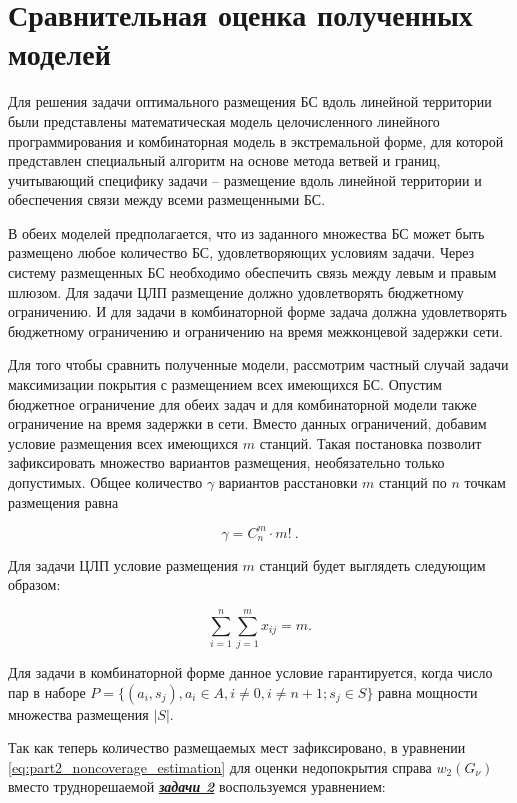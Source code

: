 \section{Сравнительная оценка полученных моделей}
Для решения задачи оптимального размещения БС вдоль линейной территории были представлены математическая модель целочисленного линейного программирования и комбинаторная модель в экстремальной форме, для которой представлен специальный алгоритм на основе метода ветвей и границ, учитывающий специфику задачи -- размещение вдоль линейной территории и обеспечения связи между всеми размещенными БС.

В обеих моделей предполагается, что из заданного множества БС может быть размещено любое количество БС, удовлетворяющих условиям задачи. Через систему размещенных БС необходимо обеспечить связь между левым и правым шлюзом. Для задачи ЦЛП размещение должно удовлетворять бюджетному ограничению. И для задачи в комбинаторной форме задача должна удовлетворять бюджетному ограничению и ограничению на время межконцевой задержки сети.

Для того чтобы сравнить полученные модели, рассмотрим частный случай задачи максимизации покрытия с размещением всех имеющихся БС. Опустим бюджетное ограничение для обеих задач и для комбинаторной модели также ограничение на время задержки в сети. Вместо данных ограничений, добавим условие размещения всех имеющихся $m$ станций. Такая постановка позволит зафиксировать множество вариантов размещения, необязательно только допустимых. Общее количество $\gamma$ вариантов расстановки $m$ станций по $n$ точкам размещения равна 

\begin{equation}
  \label{eq:part2_gamma}
  \gamma = C^m_n \cdot m! \ .
\end{equation}

Для задачи ЦЛП условие размещения $m$ станций будет выглядеть следующим образом:


\begin{equation}
  \label{eq:part3_placed_all_station}
  \sum\limits_{i=1}^n \sum\limits_{j=1}^m x_{ij} = m.
\end{equation}

Для задачи в комбинаторной форме данное условие гарантируется, когда число пар в наборе $P = \{ (a_i, s_j), a_i \in A, i \neq 0, i \neq n + 1; s_j \in S\}$ равна мощности множества размещения $|S|$. 

Так как теперь количество размещаемых мест зафиксировано, в уравнении \cref{eq:part2_noncoverage_estimation} для оценки недопокрытия справа $w_2 \left(G_\nu \right)$ вместо труднорешаемой \underline{\textit{\textbf{задачи 2}}} воспользуемся уравнением:


